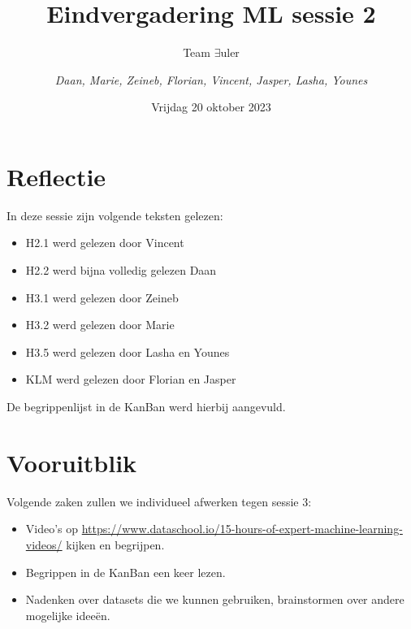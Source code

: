 \documentclass{article}
\title{Eindvergadering ML sessie 2}
\author{Team $\exists$uler \and
	\textit{Daan, Marie, Zeineb, Florian, Vincent, Jasper, Lasha, Younes}}
\date{Vrijdag 20 oktober 2023}
\begin{document}
	
\maketitle

\section*{Reflectie}

In deze sessie zijn volgende teksten gelezen:
\begin{itemize}
	\item H2.1 werd gelezen door Vincent
	\item H2.2 werd bijna volledig gelezen Daan
	\item H3.1 werd gelezen door Zeineb
	\item H3.2 werd gelezen door Marie
	\item H3.5 werd gelezen door Lasha en Younes
	\item KLM werd gelezen door Florian en Jasper
\end{itemize}

De begrippenlijst in de KanBan werd hierbij aangevuld.

\section*{Vooruitblik}

Volgende zaken zullen we individueel afwerken tegen sessie 3:
\begin{itemize}
	\item Video’s op \href{https://www.dataschool.io/15-hours-of-expert-machine-learning-videos/}{https://www.dataschool.io/15-hours-of-expert-machine-learning-videos/} kijken en begrijpen.
	\item Begrippen in de KanBan een keer lezen.
	\item Nadenken over datasets die we kunnen gebruiken, brainstormen over andere mogelijke ideeën.
\end{itemize}
\end{document}

